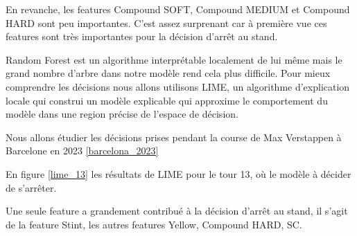 En revanche, les features Compound SOFT, Compound MEDIUM et Compound HARD sont peu importantes.
C'est assez surprenant car à première vue ces features sont très importantes pour la décision d'arrêt au stand.

Random Forest est un algorithme interprétable localement de lui même mais le grand nombre d'arbre dans notre modèle rend cela plus difficile.
Pour mieux comprendre les décisions nous allons utilisons LIME, un algorithme d'explication locale qui construi un modèle explicable qui approxime le comportement du modèle dans une region précise de l'espace de décision.

Nous allons étudier les décisions prises pendant la course de Max Verstappen à Barcelone en 2023 \ref{barcelona_2023}

En figure \ref{lime_13} les résultats de LIME pour le tour 13, où le modèle à décider de s'arrêter.

Une seule feature a grandement contribué à la décision d'arrêt au stand, il s'agit de la feature Stint, les autres features Yellow, Compound HARD, SC.